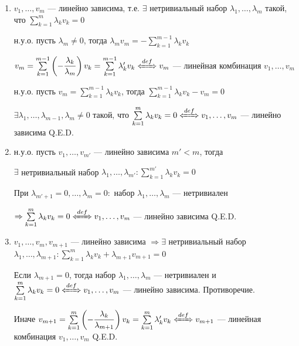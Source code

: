 \documentclass[twoside]{book}
\newcommand{\defLeftrightarrow}{\xLeftrightarrow{def}}
\begin{document}
\begin{enumerate}
    \item
          \fbox{\(\Rightarrow\)} \(v_1, \ldots, v_m\) --- линейно зависима, т.е. \(\exists\) нетривиальный набор \(\lambda_1, \ldots, \lambda_m\) такой, что \(\sum\limits_{k = 1}^{m} \lambda_k v_k = 0\)

          н.у.о. пусть \(\lambda_m \neq 0\), тогда \(\lambda_m v_m = -\sum\limits_{k = 1}^{m - 1} \lambda_k v_k\)

          \(v_m = \sum\limits_{k = 1}^{m - 1} \left(- \dfrac{\lambda_k}{\lambda_m} \right) v_k = \sum\limits_{k = 1}^{m - 1} \lambda_k' v_k \defLeftrightarrow v_m \) --- линейная комбинация \(v_1, \ldots, v_m\)

          \fbox{\(\Leftarrow\)} н.у.о. пусть \(v_m = \sum\limits_{k = 1}^{m - 1} \lambda_k v_k\), тогда \(\sum\limits_{k = 1}^{m - 1} \lambda_k v_k - v_m = 0\)

          \(\exists \lambda_1, \ldots, \lambda_{m - 1}, \lambda_m \neq 0\) такой, что \(\sum\limits_{k = 1}^{m} \lambda_k v_k = 0 \defLeftrightarrow v_1, \ldots, v_m \) --- линейно зависима \hfill Q.E.D.


    \item

          н.у.о. пусть \(v_1, \ldots, v_{m'}\) --- линейно зависима \(m' < m\), тогда

          \(\exists\) нетривиальный набор \(\lambda_1, \ldots, \lambda_{m'}: \sum\limits_{k = 1}^{m'} \lambda_k v_k = 0\)

          При \(\lambda_{m' + 1} = 0, \ldots, \lambda_m = 0:\) набор \(\lambda_1, \ldots, \lambda_m\) --- нетривиален

          \(\Rightarrow  \sum\limits_{k = 1}^{m} \lambda_k v_k = 0 \defLeftrightarrow v_1, \ldots, v_m\) --- линейно зависима \hfill Q.E.D.

    \item

          \(v_1, \ldots, v_m, v_{m + 1}\) --- линейно зависима \(\Rightarrow \exists\) нетривиальный набор \(\lambda_1, \ldots, \lambda_{m + 1}: \sum\limits_{k = 1}^{m} \lambda_k v_k + \lambda_{m+1} v_{m+1} = 0\)

          Если \(\lambda_{m + 1} = 0\), тогда набор \(\lambda_1, \ldots, \lambda_m\) --- нетривиален и \(\sum\limits_{k = 1}^{m} \lambda_k v_k = 0 \defLeftrightarrow v_1, \ldots, v_m \) --- линейно зависима. Противоречие.

          Иначе \(v_{m+1} = \sum\limits_{k = 1}^{m} \left( - \dfrac{\lambda_k}{\lambda_{m + 1}} \right) v_k = \sum\limits_{k = 1}^{m} \lambda_k' v_k \defLeftrightarrow v_{m + 1}\) --- линейная комбинация \(v_1, \ldots, v_m\) \hfill Q.E.D.
\end{enumerate}
\end{document}
